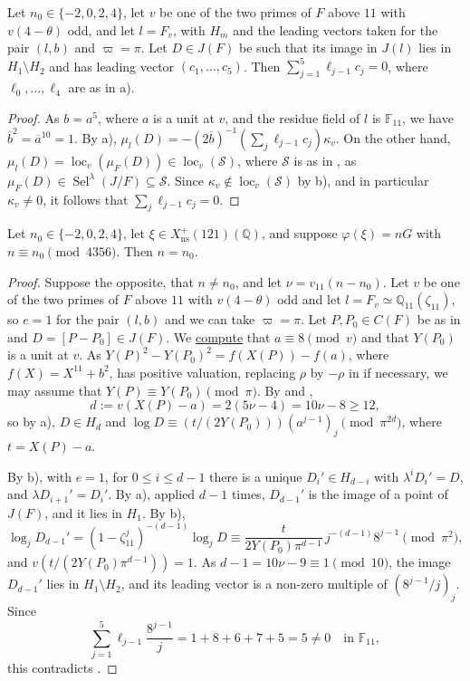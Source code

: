 \documentclass[11pt,reqno]{amsart}
\DeclareMathOperator{\Sel}{Sel}
\DeclareMathOperator{\loc}{loc}
\newcommand{\Q}{\mathbb{Q}}
\newcommand{\F}{\mathbb{F}}
\newcommand{\ns}{\mathrm{ns}}
\newcommand{\Xns}[1]{X_{\ns}^+(#1)}
\newcommand{\repocommit}{c12c8c3705ed0b6b52254df69bd5ffe84542d568}
\newcommand{\gitlink}[2]{\href{https://github.com/F-Najman/Xns-121-/blob/\repocommit/#1}{#2}}
\theoremstyle{definition}
\numberwithin{equation}{section}
\begin{document}
\begin{lemma}\label{lem:even_end}
Let $n_0\in\{-2,0,2,4\}$, let $v$ be one of the two primes of $F$ above $11$ with $v(4-\theta)$ odd, and let $l=F_v$, with $H_m$ and the leading vectors taken for the pair $(l,b)$ and $\varpi=\pi$. Let $D\in J(F)$ be such that its image in $J(l)$ lies in $H_1\setminus H_2$ and has leading vector $(c_1,\ldots,c_5)$. Then $\sum_{j=1}^5\ell_{j-1}c_j=0$, where $\ell_0,\ldots,\ell_4$ are as in  a).
\end{lemma}

\begin{proof}
As $b=a^5$, where $a$ is a unit at $v$, and the residue field of $l$ is $\F_{11}$, we have $\overline b^2=\overline a^{10}=1$. By  a), $\mu_l(D)=-(2\overline b)^{-1}(\sum_j\ell_{j-1}c_j)\kappa_v$. On the other hand, $\mu_l(D)=\loc_v(\mu_F(D))\in\loc_v(\mathcal S)$, where $\mathcal S$ is as in , as $\mu_F(D)\in\Sel^\lambda(J/F)\subseteq\mathcal S$. Since $\kappa_v\notin\loc_v(\mathcal S)$ by  b), and in particular $\kappa_v\neq 0$, it follows that $\sum_j\ell_{j-1}c_j=0$.
\end{proof}

\begin{proposition}\label{prop:even}
Let $n_0\in\{-2,0,2,4\}$, let $\xi\in\Xns{121}(\Q)$, and suppose $\varphi(\xi)=nG$ with $n\equiv n_0\pmod{4356}$. Then $n=n_0$.
\end{proposition}

\begin{proof}
Suppose the opposite, that $n\neq n_0$, and let $\nu=v_{11}(n-n_0)$. Let $v$ be one of the two primes of $F$ above $11$ with $v(4-\theta)$ odd and let $l=F_v\simeq\Q_{11}(\zeta_{11})$, so $e=1$ for the pair $(l,b)$ and we can take $\varpi=\pi$. Let $P,P_0\in C(F)$ be as in  and $D=[P-P_0]\in J(F)$. We \gitlink{code/even_geometry.m}{compute} that $a\equiv 8\pmod v$ and that $Y(P_0)$ is a unit at $v$. As $Y(P)^2-Y(P_0)^2=f(X(P))-f(a)$, where $f(X)=X^{11}+b^2$, has positive valuation, replacing $\rho$ by $-\rho$ in  if necessary, we may assume that $Y(P)\equiv Y(P_0)\pmod\pi$. By  and ,
$$d:=v(X(P)-a)=2(5\nu-4)=10\nu-8\geq 12,$$
so by  a), $D\in H_d$ and $\log D\equiv (t/(2Y(P_0)))(a^{j-1})_j\pmod{\pi^{2d}}$, where $t=X(P)-a$.

By  b), with $e=1$, for $0\leq i\leq d-1$ there is a unique $D_i'\in H_{d-i}$ with $\lambda^iD_i'=D$, and $\lambda D_{i+1}'=D_i'$. By  a), applied $d-1$ times, $D_{d-1}'$ is the image of a point of $J(F)$, and it lies in $H_1$. By  b),
$$\log_jD_{d-1}'=(1-\zeta_{11}^j)^{-(d-1)}\log_jD\equiv \frac{t}{2Y(P_0)\pi^{d-1}}\,j^{-(d-1)}8^{j-1}\pmod{\pi^2},$$
and $v(t/(2Y(P_0)\pi^{d-1}))=1$. As $d-1=10\nu-9\equiv 1\pmod{10}$, the image $D_{d-1}'$ lies in $H_1\setminus H_2$, and its leading vector is a non-zero multiple of $(8^{j-1}/j)_{j}$. Since
$$\sum_{j=1}^5\ell_{j-1}\frac{8^{j-1}}{j}=1+8+6+7+5=5\neq 0 \quad\text{in } \F_{11},$$
this contradicts .
\end{proof}
\end{document}
